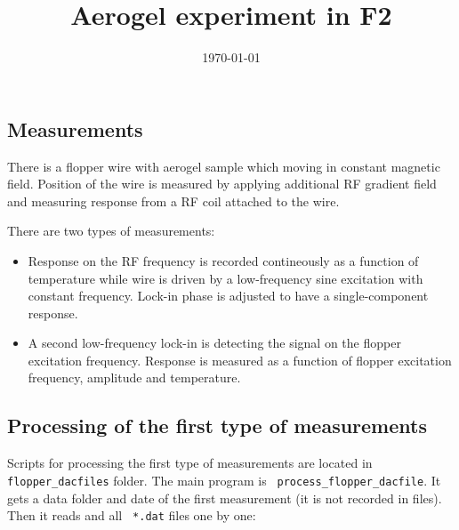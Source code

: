\documentclass{article}
\begin{document}
\title{Aerogel experiment in F2}

\author{}

\date{\today}
\maketitle

\subsection*{Measurements}

There is a flopper wire with aerogel sample which moving in constant magnetic field.
Position of the wire is measured by applying additional RF gradient field and measuring
response from a RF coil attached to the wire.

There are two types of measurements:

\begin{itemize}

\item  Response on the RF frequency is recorded
contineously as a function of temperature while wire is driven by a
low-frequency sine excitation with constant frequency. Lock-in phase is
adjusted to have a single-component response.

\item  A second low-frequency lock-in is detecting the signal on the
flopper excitation frequency. Response is measured as a function of
flopper excitation frequency, amplitude and temperature.

\end{itemize}

\subsection*{Processing of the first type of measurements}

Scripts for processing the first type of measurements are located in {\tt
flopper\_dacfiles} folder. The main program is {\tt
process\_flopper\_dacfile}. It gets a data folder and date of the first
measurement (it is not recorded in files). Then it reads and all {\tt
*.dat} files one by one:
\end{document}
